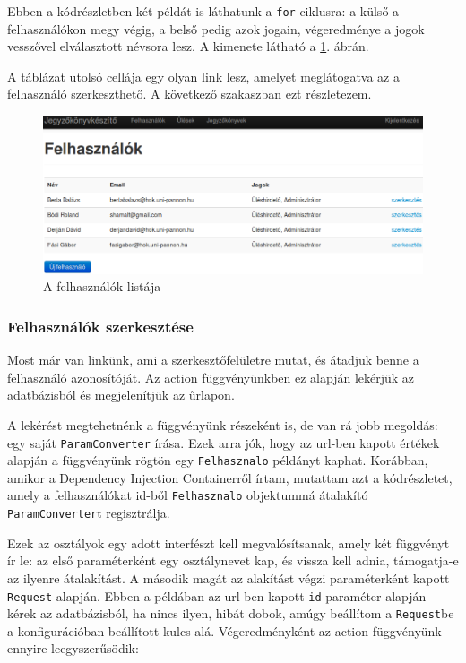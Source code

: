 \documentclass[a4paper,12pt,oneside]{report}
\begin{document}
Ebben a kódrészletben két példát is láthatunk a {\tt for} ciklusra: a külső a felhasználókon megy végig, a belső pedig azok jogain, végeredménye a jogok vesszővel elválasztott névsora lesz. A kimenete látható a \ref{fig:felhasznalo_lista}. ábrán.

A táblázat utolsó cellája egy olyan link lesz, amelyet meglátogatva az a felhasználó szerkeszthető. A következő szakaszban ezt részletezem.

\begin{figure}[h]
    \includegraphics[width=\textwidth]{felhasznalo_lista.png}
    \caption{A felhasználók listája}
    \label{fig:felhasznalo_lista}
\end{figure}

\subsubsection*{Felhasználók szerkesztése}

Most már van linkünk, ami a szerkesztőfelületre mutat, és átadjuk benne a felhasználó azonosítóját. Az action függvényünkben ez alapján lekérjük az adatbázisból és megjelenítjük az űrlapon.

A lekérést megtehetnénk a függvényünk részeként is, de van rá jobb megoldás: egy saját {\tt ParamConverter} írása. Ezek arra jók, hogy az url-ben kapott értékek alapján a függvényünk rögtön egy {\tt Felhasznalo} példányt kaphat. Korábban, amikor a Dependency Injection Containerről írtam, mutattam azt a kódrészletet, amely a felhasználókat id-ből {\tt Felhasznalo} objektummá átalakító {\tt ParamConverter}t regisztrálja.

Ezek az osztályok egy adott interfészt kell megvalósítsanak, amely két függvényt ír le: az első paraméterként egy osztálynevet kap, és vissza kell adnia, támogatja-e az ilyenre átalakítást. A második magát az alakítást végzi paraméterként kapott {\tt Request} alapján. Ebben a példában az url-ben kapott {\tt id} paraméter alapján kérek az adatbázisból, ha nincs ilyen, hibát dobok, amúgy beállítom a {\tt Request}be a konfigurációban beállított kulcs alá. Végeredményként az action függvényünk ennyire leegyszerűsödik:
\end{document}
